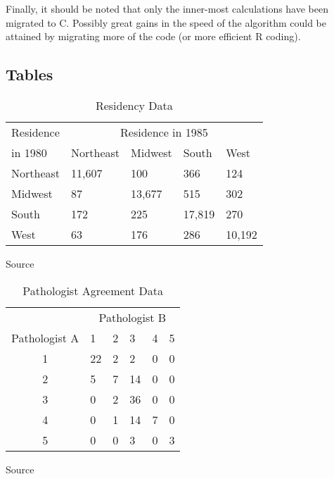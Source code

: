 \documentclass[a4paper]{article}
\begin{document}
Finally, it should be noted that only the inner-most calculations have
been migrated to C. Possibly great gains in the speed of the algorithm
could be attained by migrating more of the code (or more efficient R
coding).

 
\begin{appendix}

\section{Tables}
\begin{table}[H]
\begin{center}
\begin{tabular}{lllll} \hline
Residence & \multicolumn{4}{c}{Residence in 1985} \\ \cline{2-5}
in 1980 & Northeast & Midwest & South & West \\ \hline
Northeast & 11,607  & 100     & 366    & 124    \\
Midwest   & 87      & 13,677  & 515    & 302    \\
South     & 172     & 225     & 17,819 & 270    \\
West      & 63      & 176     & 286    & 10,192 \\ \hline
\end{tabular}
\end{center}
\caption{Residency Data}
\label{tab:res}
Source \cite{agre:1990}
\end{table}

\begin{table}[H]
\begin{center}
\begin{tabular}{clllll}  \hline
& \multicolumn{5}{c}{Pathologist B}  \\ \cline{2-6}
Pathologist A & 1 & 2 & 3 & 4 & 5 \\ \hline
1 & 22 & 2 & 2 & 0 & 0 \\
2 & 5  & 7 & 14 & 0 & 0 \\
3 & 0 & 2 & 36 & 0 & 0 \\
4 & 0 & 1 & 14 & 7 & 0 \\
5 & 0 & 0 & 3 & 0 & 3 \\ \hline
\end{tabular} 
\end{center}
\caption{Pathologist Agreement Data}
\label{tab:path}
Source \cite{agre:1990}
\end{table}



\end{appendix}
\end{document}
